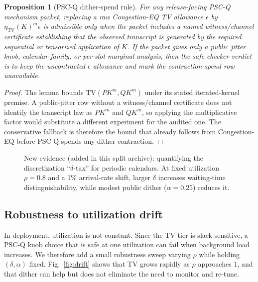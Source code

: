 \documentclass[11pt]{article}
\newtheorem{proposition}{Proposition}
\theoremstyle{definition}
\theoremstyle{remark}
\newcommand{\TV}{\mathrm{TV}}
\begin{document}
\begin{proposition}[PSC-Q dither-spend rule]\label{prop:pscq-dither-spend-rule}
For any release-facing PSC-Q mechanism packet, replacing a raw Congestion-EQ TV allowance \(\epsilon\) by \(\eta_{\TV}(K)^m\epsilon\) is admissible only when the packet includes a named witness/channel certificate establishing that the observed transcript is generated by the required sequential or tensorized application of \(K\).  If the packet gives only a public jitter knob, calendar family, or per-slot marginal analysis, then the safe checker verdict is to keep the uncontracted \(\epsilon\) allowance and mark the contraction-spend row unavailable.
\end{proposition}

\begin{proof}
The lemma bounds \(\TV(PK^m,QK^m)\) under its stated iterated-kernel premise.  A public-jitter row without a witness/channel certificate does not identify the transcript law as \(PK^m\) and \(QK^m\), so applying the multiplicative factor would substitute a different experiment for the audited one.  The conservative fallback is therefore the bound that already follows from Congestion-EQ before PSC-Q spends any dither contraction.
\end{proof}


\begin{figure}[t]
\centering
{}
\caption{New evidence (added in this split archive): quantifying the discretization ``$\delta$-tax'' for periodic calendars.
At fixed utilization $\rho=0.8$ and a 1\% arrival-rate shift, larger $\delta$ increases waiting-time distinguishability, while modest public dither ($\alpha=0.25$) reduces it.}
\label{fig:deltatax}
\end{figure}

\subsection{Robustness to utilization drift}
In deployment, utilization is not constant.
Since the TV tier is slack-sensitive, a PSC-Q knob choice that is safe at one utilization can fail when background load increases.
We therefore add a small robustness sweep varying $\rho$ while holding $(\delta,\alpha)$ fixed.
Fig.~\ref{fig:drift} shows that TV grows rapidly as $\rho$ approaches 1, and that dither can help but does not eliminate the need to monitor and re-tune.
\end{document}
